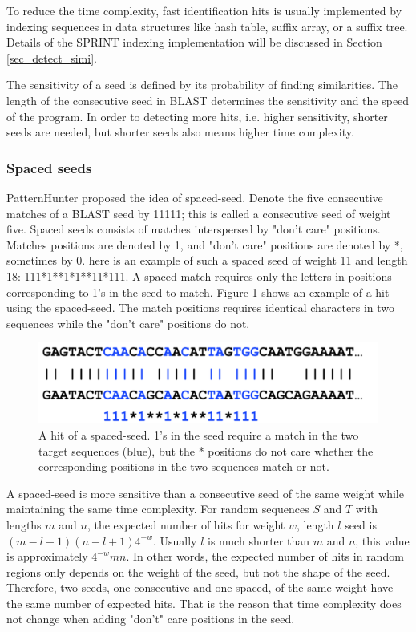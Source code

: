 To reduce the time complexity, fast identification hits is usually implemented by indexing sequences in data structures like hash table, suffix array, or a suffix tree. Details of the SPRINT indexing implementation will be discussed in Section \ref{sec_detect_simi}. 

The sensitivity of a seed is defined by its probability of finding similarities. The length of the consecutive seed in BLAST determines the sensitivity and the speed of the program. In order to detecting more hits, i.e. higher sensitivity, shorter seeds are needed, but shorter seeds also means higher time complexity.

\subsubsection{Spaced seeds}
PatternHunter proposed \cite{Ma02_PatternHunter} the idea of spaced-seed. Denote the five consecutive matches of a BLAST seed by 11111; this is called a consecutive seed of weight five. Spaced  seeds consists of matches interspersed by "don’t care" positions. Matches positions are denoted by 1, and "don't care" positions are denoted by *, sometimes by 0. here is an example of such a spaced seed of weight 11 and length 18: 111*1**1*1**11*111. A spaced match requires only the letters in positions corresponding to 1’s in the seed to match. Figure \ref{fig_hit_spaced_seed} shows an example of a hit using the spaced-seed. The match positions requires identical characters in two sequences while the "don't care" positions do not.

\begin{figure}[h!]
\begin{center}
\includegraphics[height =3.5 cm]{img/spaced_seed_hit.png}
\caption[A hit of a spaced-seed]{A hit of a spaced-seed. 1's in the seed require a match in the two target sequences (blue), but the * positions do not care whether the corresponding positions in the two sequences match or not.  \label{fig_hit_spaced_seed}}
\end{center}
\end{figure}

A spaced-seed is more sensitive than a consecutive seed of the same weight while maintaining the same time complexity. For random sequences $S$ and $T$ with lengths $m$ and $n$, the expected number of hits for weight $w$, length $l$ seed is $(m-l+1)(n-l+1)4^{-w}$. Usually $l$ is much shorter than $m$ and $n$, this value is approximately $4^{-w}mn$. In other words, the expected number of hits in random regions only depends on the weight of the seed, but not the shape of the seed. Therefore, two seeds, one consecutive and one spaced, of the same weight have the same number of expected hits. That is the reason that time complexity does not change when adding "don't" care positions in the seed.


